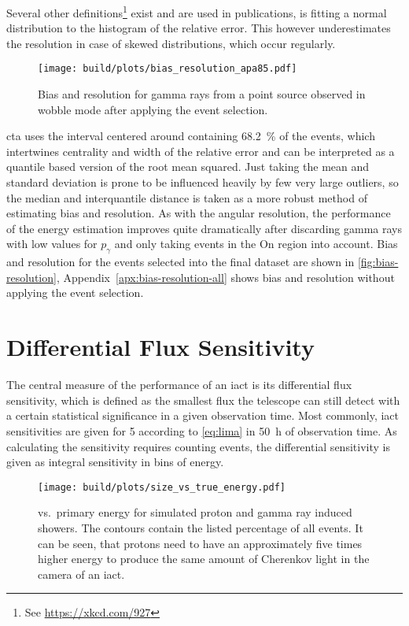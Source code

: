Several other definitions\footnote{See \url{https://xkcd.com/927}} exist and are used in publications,
\cite{magic-performance} is fitting a normal distribution to the histogram of the relative error.
This however underestimates the resolution in case of skewed distributions,
which occur regularly.
\begin{figure}
  \centering
  \texttt{[image: build/plots/bias\_resolution\_apa85.pdf]}
  \caption{%
    Bias and resolution for gamma rays from a point source observed in wobble mode
    after applying the event selection.
  }\label{fig:bias-resolution}
\end{figure}
\gls{cta} uses the interval centered around {} containing \SI{68.2}{\percent}
of the events, which intertwines centrality and width of the relative error
and can be interpreted as a quantile based version of the root mean squared.
Just taking the mean and standard deviation is prone to be influenced heavily by
few very large outliers, so the median and interquantile distance is taken as a 
more robust method of estimating bias and resolution.
As with the angular resolution, the performance of the energy estimation improves
quite dramatically after discarding gamma rays with low values for $p_\gamma$ and
only taking events in the On region into account.
Bias and resolution for the events selected into the final dataset are shown in 
\autoref{fig:bias-resolution}, Appendix~\ref{apx:bias-resolution-all} shows bias and
resolution without applying the event selection.

\section{Differential Flux Sensitivity}\label{sec:sensitivity}
The central measure of the performance of an \gls{iact} is its
differential flux sensitivity, which is defined as the smallest flux the
telescope can still detect with a certain statistical significance in a given
observation time.
Most commonly, \gls{iact} sensitivities are given for \SI{5}{\sigma} according
to \eqref{eq:lima} in \SI{50}{\hour} of observation time.
As calculating the sensitivity requires counting events, the differential sensitivity 
is given as integral sensitivity in bins of energy.

\begin{figure}
  \centering
  \texttt{[image: build/plots/size\_vs\_true\_energy.pdf]}
  \caption{%
     vs.\ primary energy for simulated proton and gamma ray induced showers.
    The contours contain the listed percentage of all events.
    It can be seen, that protons need to have an approximately five times higher energy
    to produce the same amount of Cherenkov light in the camera of an \gls{iact}.
  }\label{fig:size-energy-comp}
\end{figure}


